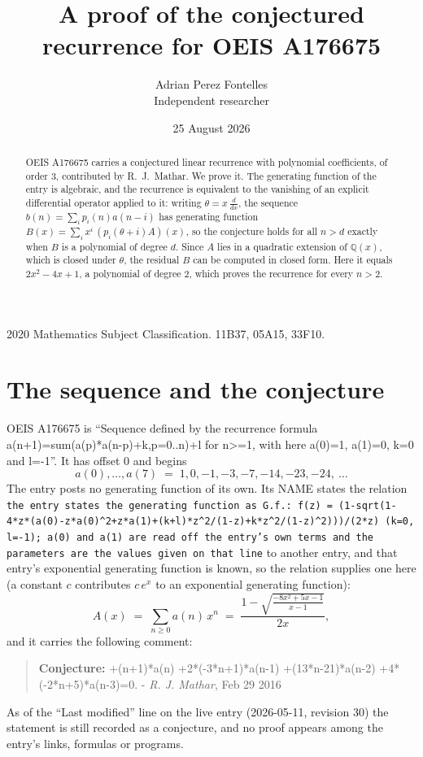 \documentclass[11pt,a4paper]{article}
\title{A proof of the conjectured recurrence for OEIS A176675}
\author{Adrian Perez Fontelles\\ \small Independent researcher}
\date{25 August 2026}
\theoremstyle{plain}
\theoremstyle{definition}
\begin{document}
\maketitle

\begin{abstract}
OEIS A176675 carries a conjectured linear recurrence with polynomial coefficients, of
order 3, contributed by R.~J.~Mathar. We prove it. The generating function of the
entry is algebraic, and the recurrence is equivalent to the vanishing of an explicit
differential operator applied to it: writing $\theta=x\,\frac{d}{dx}$, the sequence
$b(n)=\sum_{i}p_{i}(n)a(n-i)$ has generating function
$B(x)=\sum_{i}x^{i}\,(p_{i}(\theta+i)A)(x)$, so the conjecture holds for all $n>d$ exactly
when $B$ is a polynomial of degree $d$. Since $A$ lies in a quadratic extension of
$\mathbb{Q}(x)$, which is closed under $\theta$, the residual $B$ can be computed in
closed form. Here it equals $2 x^{2} - 4 x + 1$, a polynomial of degree $2$, which proves
the recurrence for every $n>2$.
\end{abstract}

\noindent\small 2020 Mathematics Subject Classification. 11B37, 05A15, 33F10.\normalsize

\section{The sequence and the conjecture}

OEIS A176675 is ``Sequence defined by the recurrence formula a(n+1)=sum(a(p)*a(n-p)+k,p=0..n)+l for n>=1, with here a(0)=1, a(1)=0, k=0 and l=-1''. It has offset $0$ and begins
\[
a(0),\dots,a(7)\;=\;1, 0, -1, -3, -7, -14, -23, -24,\ \dots
\]
The entry posts no generating function of its own. Its NAME states the
relation \texttt{the entry states the generating function as G.f.: f(z) = (1-sqrt(1-4*z*(a(0)-z*a(0)\textasciicircum{}2+z*a(1)+(k+l)*z\textasciicircum{}2/(1-z)+k*z\textasciicircum{}2/(1-z)\textasciicircum{}2)))/(2*z) (k=0, l=-1); a(0) and a(1) are read off the entry's own terms and the parameters are the values given on that line} to another entry, and that entry's exponential generating
function is known, so the relation supplies one here (a constant $c$ contributes
$c\,e^{x}$ to an exponential generating function):
\begin{equation}\label{eq:gf}
A(x)\;=\;\sum_{n\ge 0} a(n)\,x^{n}\;=\;\frac{1 - \sqrt{\frac{- 8 x^{2} + 5 x - 1}{x - 1}}}{2 x} ,
\end{equation}
and it carries the following comment:
\begin{quote}\small
\textbf{Conjecture:} +(n+1)*a(n) +2*(-3*n+1)*a(n-1) +(13*n-21)*a(n-2) +4*(-2*n+5)*a(n-3)=0. - \emph{R. J. Mathar}, Feb 29 2016
\end{quote}
As of the ``Last modified'' line on the live entry (2026-05-11, revision 30) the
statement is still recorded as a conjecture, and no proof appears among the entry's links,
formulas or programs.
\end{document}
